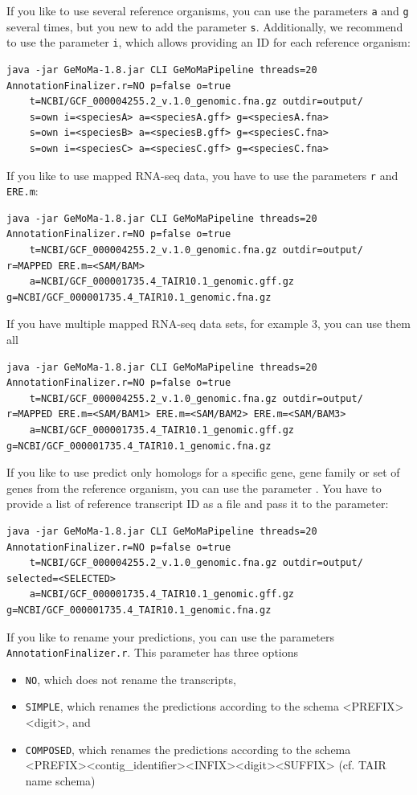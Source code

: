 \documentclass{article}
\begin{document}
If you like to use several reference organisms, you can use the parameters \verb+a+ and \verb+g+ several times, but you new to add the parameter \verb+s+. Additionally, we recommend to use the parameter \verb+i+, which allows providing an ID for each reference organism:
\begin{Verbatim}
java -jar GeMoMa-1.8.jar CLI GeMoMaPipeline threads=20 AnnotationFinalizer.r=NO p=false o=true 
	t=NCBI/GCF_000004255.2_v.1.0_genomic.fna.gz outdir=output/
	s=own i=<speciesA> a=<speciesA.gff> g=<speciesA.fna>
	s=own i=<speciesB> a=<speciesB.gff> g=<speciesC.fna>
	s=own i=<speciesC> a=<speciesC.gff> g=<speciesC.fna>
\end{Verbatim}
If you like to use mapped RNA-seq data, you have to use the parameters \verb+r+ and \verb+ERE.m+:
\begin{Verbatim}
java -jar GeMoMa-1.8.jar CLI GeMoMaPipeline threads=20 AnnotationFinalizer.r=NO p=false o=true
	t=NCBI/GCF_000004255.2_v.1.0_genomic.fna.gz outdir=output/ r=MAPPED ERE.m=<SAM/BAM>
	a=NCBI/GCF_000001735.4_TAIR10.1_genomic.gff.gz g=NCBI/GCF_000001735.4_TAIR10.1_genomic.fna.gz 
\end{Verbatim}
If you have multiple mapped RNA-seq data sets, for example 3, you can use them all
\begin{Verbatim}
java -jar GeMoMa-1.8.jar CLI GeMoMaPipeline threads=20 AnnotationFinalizer.r=NO p=false o=true 
	t=NCBI/GCF_000004255.2_v.1.0_genomic.fna.gz outdir=output/ r=MAPPED ERE.m=<SAM/BAM1> ERE.m=<SAM/BAM2> ERE.m=<SAM/BAM3>
	a=NCBI/GCF_000001735.4_TAIR10.1_genomic.gff.gz g=NCBI/GCF_000001735.4_TAIR10.1_genomic.fna.gz 
\end{Verbatim}
If you like to use predict only homologs for a specific gene, gene family or set of genes from the reference organism, you can use the parameter \verb++. You have to provide a list of reference transcript ID as a file and pass it to the parameter:
\begin{Verbatim}
java -jar GeMoMa-1.8.jar CLI GeMoMaPipeline threads=20 AnnotationFinalizer.r=NO p=false o=true 
	t=NCBI/GCF_000004255.2_v.1.0_genomic.fna.gz outdir=output/ selected=<SELECTED>
	a=NCBI/GCF_000001735.4_TAIR10.1_genomic.gff.gz g=NCBI/GCF_000001735.4_TAIR10.1_genomic.fna.gz 
\end{Verbatim}
If you like to rename your predictions, you can use the parameters \verb+AnnotationFinalizer.r+. This parameter has three options
\begin{itemize}
\item \verb+NO+, which does not rename the transcripts,
\item \verb+SIMPLE+, which renames the predictions according to the schema <PREFIX><digit>, and
\item \verb+COMPOSED+, which renames the predictions according to the schema <PREFIX><contig\_identifier><INFIX><digit><SUFFIX> (cf. TAIR name schema)
\end{itemize}
\end{document}

